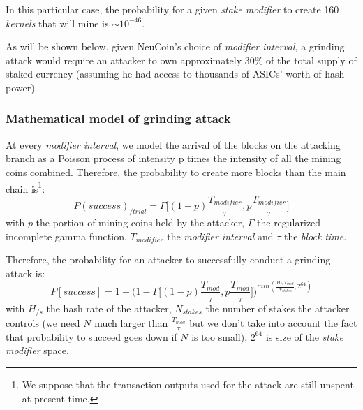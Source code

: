 \documentclass[a4paper,11pt]{article}
\begin{document}
In this particular case, the probability for a given \textit{stake modifier} to create 160 \textit{kernels} that will mine is $\sim10^{-46}$. 

As will be shown below, given NeuCoin's choice of \textit{modifier interval}, a grinding attack would require an attacker to own approximately 30\% of the total supply of staked currency (assuming he had access to thousands of ASICs' worth of hash power).

\subsubsection*{Mathematical model of grinding attack}

At every \textit{modifier interval}, we model the arrival of the blocks on the attacking branch as a Poisson process of intensity p times the intensity of all the mining coins combined. Therefore, the probability to create more blocks than the main chain is\footnote{We suppose that the transaction outputs used for the attack are still unspent at present time.}:
$$P(success)_{/trial}=\Gamma\Big[(1-p)\frac{T_{modifier}}{\tau},p\frac{T_{modifier}}{\tau}\Big]$$
with $p$ the portion of mining coins held by the attacker, $\Gamma$ the regularized incomplete gamma function, $T_{modifier}$ the \textit{modifier interval} and $\tau$ the \textit{block time}.

Therefore, the probability for an attacker to successfully conduct a grinding attack is:
$$P[success]=1-\bigg(1- \Gamma\Big[(1-p)\frac{T_{mod}}{\tau},p\frac{T_{mod}}{\tau}\Big]\bigg)^{min( \frac{ H_{/s}T_{mod} }{N_{stakes}},2^{64}) }$$
with $H_{/s}$ the hash rate of the attacker, $N_{stakes}$ the number of stakes the attacker controls (we need $N$ much larger than $\frac{T_{mod}}{\tau}$ but we don't take into account the fact that probability to succeed goes down if $N$ is too small), $2^{64}$ is size of the \textit{stake modifier} space.
\end{document}
